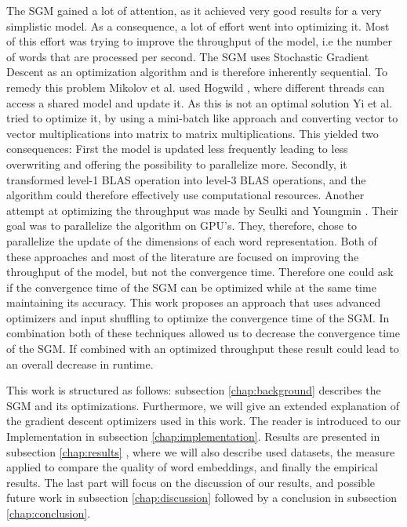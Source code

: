 \documentclass[conference]{IEEEtran}
\begin{document}
The SGM gained a lot of attention, as it achieved very good results for a very simplistic model. As a consequence, a lot of effort went into optimizing it. Most of this effort was trying to improve the throughput of the model, i.e the number of words that are processed per second. The SGM uses Stochastic Gradient Descent as an optimization algorithm and is therefore inherently sequential. To remedy this problem Mikolov et al. used Hogwild \cite{hogwild}, where different threads can access a shared model and update it. As this is not an optimal solution Yi et al. \cite{intel} tried to optimize it, by using a mini-batch like approach and converting vector to vector multiplications into matrix to matrix multiplications. This yielded two consequences: First the model is updated less frequently leading to less overwriting and offering the possibility to parallelize more. Secondly, it transformed level-1 BLAS operation into level-3 BLAS operations, and the algorithm could therefore effectively use computational resources. Another attempt at optimizing the throughput was made by Seulki and Youngmin \cite{gpu}. Their goal was to parallelize the algorithm on GPU's. They, therefore, chose to parallelize the update of the dimensions of each word representation. Both of these approaches and most of the literature are focused on improving the throughput of the model, but not the convergence time.  Therefore one could ask if the convergence time of the SGM can be optimized while at the same time maintaining its accuracy. This work proposes an approach that uses advanced optimizers and input shuffling to optimize the convergence time of the SGM. In combination both of these techniques allowed us to decrease the convergence time of the SGM. If combined with an optimized throughput these result could lead to an overall decrease in runtime.

This work is structured as follows: subsection \ref{chap:background}  describes the SGM and its optimizations. Furthermore, we will give an extended explanation of the gradient descent optimizers used in this work. The reader is introduced to our Implementation in subsection \ref{chap:implementation}. Results are presented in  subsection \ref{chap:results} , where we will also describe used datasets, the measure applied to compare the quality of word embeddings, and finally the empirical results. The last part will focus on the discussion of our results, and possible future work in subsection \ref{chap:discussion} followed by a conclusion in subsection \ref{chap:conclusion}.
\end{document}
